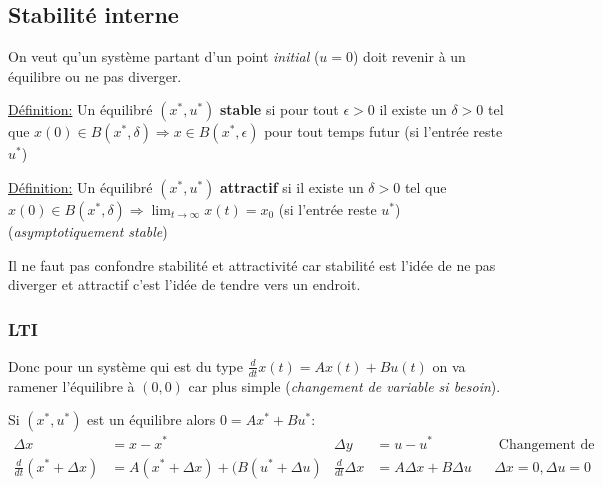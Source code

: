 \documentclass{report}
\begin{document}
\subsection{Stabilité interne}
On veut qu'un système partant d'un point \textit{initial} ($u=0$) doit revenir à un équilibre ou ne pas diverger.\par
\underline{Définition:} Un équilibré $(x^{\ast},u^{\ast})$ \textbf{stable} si pour tout $\epsilon > 0$ il existe un $\delta > 0$ tel que $x(0) \in B(x^{\ast}, \delta) \Rightarrow x \in B(x^{\ast}, \epsilon)$ pour tout temps futur (si l'entrée reste $u^{\ast}$)\par 
\underline{Définition:} Un équilibré $(x^{\ast},u^{\ast})$ \textbf{attractif} si il existe un $\delta > 0$ tel que $x(0) \in B(x^{\ast}, \delta) \Rightarrow \lim_{t \rightarrow \infty} x(t) =  x_0$ (si l'entrée reste $u^{\ast}$) (\textit{asymptotiquement stable})\par 
Il ne faut pas confondre stabilité et attractivité car  stabilité est l'idée de ne pas diverger et attractif c'est l'idée de tendre vers un endroit.

\subsubsection{LTI}
Donc pour un système qui est du type $\frac{d}{dt}x(t) = Ax(t) + Bu(t)$ on va ramener l'équilibre à $(0,0)$ car plus simple (\textit{changement de variable si besoin}).\par 
Si $(x^{\ast}, u^{\ast})$ est un équilibre alors $0 = Ax^{\ast} + Bu^{\ast}$:
\begin{align*}
\Delta x &= x - x^{\ast} & \Delta y &= u - u^{\ast} & &\text{ Changement de variable}\\
\frac{d}{dt}(x^{\ast} + \Delta x) &= A(x^{\ast} + \Delta x) + (B(u^{\ast} + \Delta u) & \frac{d}{dt} \Delta x &= A \Delta x + B \Delta u & &\Delta x = 0, \Delta u= 0
\end{align*}
\end{document}
